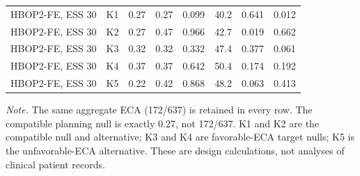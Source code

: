 \begin{table}[t]
{\begin{tabular}{llrrrrrr}
HBOP2-FE, ESS 30 & K1 & 0.27 & 0.27 & 0.099 & 40.2 & 0.641 & 0.012 \\
HBOP2-FE, ESS 30 & K2 & 0.27 & 0.47 & 0.966 & 42.7 & 0.019 & 0.662 \\
HBOP2-FE, ESS 30 & K3 & 0.32 & 0.32 & 0.332 & 47.4 & 0.377 & 0.061 \\
HBOP2-FE, ESS 30 & K4 & 0.37 & 0.37 & 0.642 & 50.4 & 0.174 & 0.192 \\
HBOP2-FE, ESS 30 & K5 & 0.22 & 0.42 & 0.868 & 48.2 & 0.063 & 0.413 \\
\bottomrule
\end{tabular}%
}
\par\vspace{3pt}
\begin{minipage}{\textwidth}\footnotesize
\textit{Note.} The same aggregate ECA (172/637) is retained in every row. The compatible planning null is exactly 0.27, not 172/637. K1 and K2 are the compatible null and alternative; K3 and K4 are favorable-ECA target nulls; K5 is the unfavorable-ECA alternative. These are design calculations, not analyses of clinical patient records.
\end{minipage}
\end{table}
